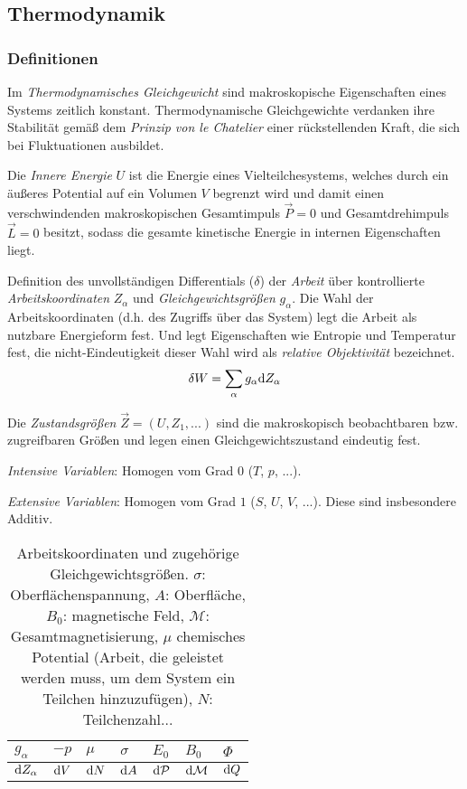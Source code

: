 \documentclass[11pt]{article}
\numberwithin{equation}{section}
\begin{document}
		\subsection{Thermodynamik}
			\subsubsection{Definitionen}
				Im \emph{Thermodynamisches Gleichgewicht} sind makroskopische Eigenschaften eines Systems zeitlich konstant. Thermodynamische Gleichgewichte verdanken ihre Stabilität gemäß dem \emph{Prinzip von le Chatelier} einer rückstellenden Kraft, die sich bei Fluktuationen ausbildet. \vsp

				Die \emph{Innere Energie} $U$ ist die Energie eines Vielteilchesystems, welches durch ein äußeres Potential auf ein Volumen $V$ begrenzt wird und damit einen verschwindenden makroskopischen Gesamtimpuls $\vec{P}=0$ und Gesamtdrehimpuls $\vec{L} = 0$ besitzt, sodass die gesamte kinetische Energie in internen Eigenschaften liegt. \vsp

				Definition des unvollständigen Differentials ($\delta$) der \emph{Arbeit} über kontrollierte \emph{Arbeitskoordinaten} $Z_\alpha$ und \emph{Gleichgewichtsgrößen} $g_\alpha$. Die Wahl der Arbeitskoordinaten (d.h. des Zugriffs über das System) legt die Arbeit als nutzbare Energieform fest. Und legt Eigenschaften wie Entropie und Temperatur fest, die nicht-Eindeutigkeit dieser Wahl wird als \emph{relative Objektivität} bezeichnet.
				\begin{equation}
					\delta W = \sum_\alpha g_\alpha \mathrm{d} Z_\alpha
				\end{equation} \vsp

				Die \emph{Zustandsgrößen} $\vec{Z}=\left(U, Z_1,... \right)$ sind die makroskopisch beobachtbaren bzw. zugreifbaren Größen und legen einen Gleichgewichtszustand eindeutig fest. \vsp

				\emph{Intensive Variablen}: Homogen vom Grad $0$ ($T$, $p$, ...). \vsp

				\emph{Extensive Variablen}: Homogen vom Grad $1$ ($S$, $U$, $V$, ...). Diese sind insbesondere Additiv. \vsp

				\begin{table}[h]
					\begin{center}
					\begin{tabular}{ l | l l l l l l }
						$g_\alpha$ & $-p$ & $\mu$ & $\sigma$ & $E_0$ & $B_0$ & $\Phi$ \\ \hline
						$\mathrm{d} Z_\alpha$ & $\mathrm{d} V$ & $\mathrm{d} N$ & $\mathrm{d} A$ & $\mathrm{d} \mathcal{P}$ & $\mathrm{d} \mathcal{M}$ & $\mathrm{d} Q$ \\
						\end{tabular}
					\caption{Arbeitskoordinaten und zugehörige Gleichgewichtsgrößen. $\sigma$: Oberflächenspannung, $A$: Oberfläche, $B_0$: magnetische Feld, $\mathcal{M}$: Gesamtmagnetisierung, $\mu$ chemisches Potential (Arbeit, die geleistet werden muss, um dem System ein Teilchen hinzuzufügen), $N$: Teilchenzahl...}
					\label{tab:ArbeitskoordinatenUndGleichgewichtsgroessen}
					\end{center}
				\end{table} \vsp
\end{document}
